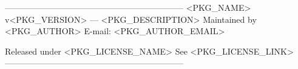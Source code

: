 \preamble
---------------------------------------------------------------
<PKG_NAME> v<PKG_VERSION> --- <PKG_DESCRIPTION>
Maintained by <PKG_AUTHOR>
E-mail: <PKG_AUTHOR_EMAIL>

Released under <PKG_LICENSE_NAME>
See <PKG_LICENSE_LINK>
---------------------------------------------------------------
\endpreamble
